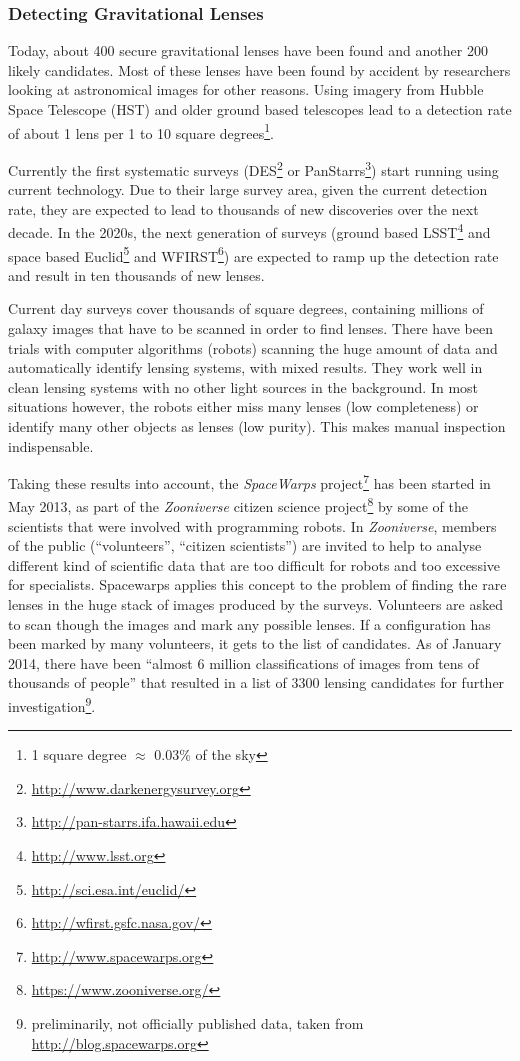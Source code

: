 \documentclass[11pt]{article}
\begin{document}
\subsubsection{Detecting Gravitational Lenses}

Today, about 400 secure gravitational lenses have been found and another 200 likely candidates.
Most of these lenses have been found by accident by researchers looking at astronomical images for other reasons.
Using imagery from Hubble Space Telescope (HST) and older ground based telescopes lead to a detection rate of about 1 lens per 1 to 10 square degrees\footnote{1 square degree $\approx$ 0.03\% of the sky}.

Currently the first systematic surveys (DES\footnote{\url{http://www.darkenergysurvey.org}} or PanStarrs\footnote{\url{http://pan-starrs.ifa.hawaii.edu}}) start running using current technology.
Due to their large survey area, given the current detection rate, they are expected to lead to thousands of new discoveries over the next decade.
In the 2020s, the next generation of surveys (ground based LSST\footnote{\url{http://www.lsst.org}} and space based Euclid\footnote{\url{http://sci.esa.int/euclid/}} and WFIRST\footnote{\url{http://wfirst.gsfc.nasa.gov/}}) are expected to ramp up the detection rate and result in ten thousands of new lenses.

Current day surveys cover thousands of square degrees, containing millions of galaxy images that have to be scanned in order to find lenses.
There have been trials with computer algorithms (robots) scanning the huge amount of data and automatically identify lensing systems\cite{robots}, with mixed results.
They work well in clean lensing systems with no other light sources in the background.
In most situations however, the robots either miss many lenses (low completeness) or identify many other objects as lenses (low purity).
This makes manual inspection indispensable.

Taking these results into account, the \emph{SpaceWarps} project\footnote{\url{http://www.spacewarps.org}} has been started in May 2013, as part of the \emph{Zooniverse} citizen science project\footnote{\url{https://www.zooniverse.org/}} by some of the scientists that were involved with programming robots.
In \emph{Zooniverse}, members of the public (``volunteers'', ``citizen scientists'') are invited to help to analyse different kind of scientific data that are too difficult for robots and too excessive for specialists.
Spacewarps applies this concept to the problem of finding the rare lenses in the huge stack of images produced by the surveys.
Volunteers are asked to scan though the images and mark any possible lenses.
If a configuration has been marked by many volunteers, it gets to the list of candidates.
As of January 2014, there have been ``almost 6 million classifications of images from tens of thousands of people'' that resulted in a list of 3300 lensing candidates for further investigation\footnote{preliminarily, not officially published data, taken from \url{http://blog.spacewarps.org}}.
\end{document}
